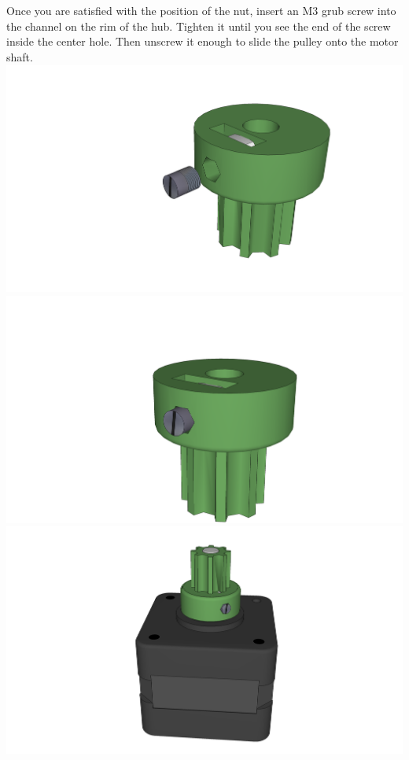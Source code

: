 \documentclass[twoside,openany,a4paper,titlepage]{memoir}
\begin{document}
	\section{}
	Once you are satisfied with the position of the nut, insert an M3 grub screw into the channel on the rim
	of the hub. Tighten it until you see the end of the screw inside the center hole. Then unscrew it enough
	to slide the pulley onto the motor shaft.\\
	\includegraphics[width=1\linewidth]{graphics/ch6_15_1.png}
	\includegraphics[width=1\linewidth]{graphics/ch6_15_2.png}
	\includegraphics[width=1\linewidth]{graphics/ch6_15_3.png}
	
\end{document}
